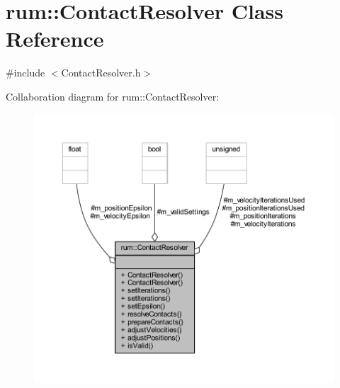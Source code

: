 \hypertarget{classrum_1_1_contact_resolver}{}\section{rum\+:\+:Contact\+Resolver Class Reference}
\label{classrum_1_1_contact_resolver}


{\ttfamily \#include $<$Contact\+Resolver.\+h$>$}



Collaboration diagram for rum\+:\+:Contact\+Resolver\+:\nopagebreak
\begin{figure}[H]
\begin{center}
\leavevmode
\includegraphics[width=350pt]{classrum_1_1_contact_resolver__coll__graph}
\end{center}
\end{figure}
